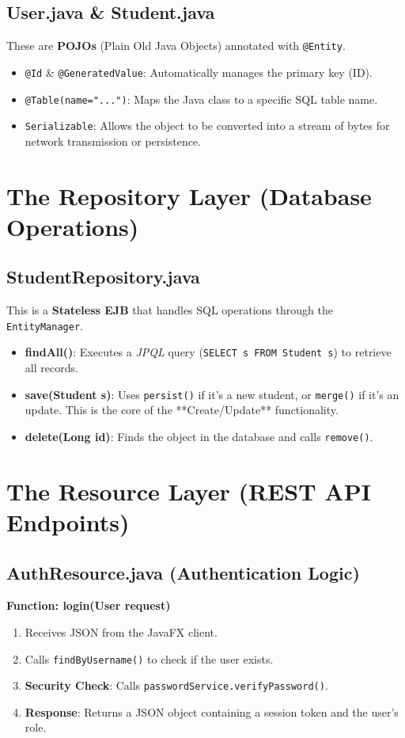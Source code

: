 \documentclass[12pt,a4paper]{article}
\begin{document}
\subsection{User.java \& Student.java}
These are \textbf{POJOs} (Plain Old Java Objects) annotated with \texttt{@Entity}.
\begin{itemize}
    \item \texttt{@Id} \& \texttt{@GeneratedValue}: Automatically manages the primary key (ID).
    \item \texttt{@Table(name="...")}: Maps the Java class to a specific SQL table name.
    \item \texttt{Serializable}: Allows the object to be converted into a stream of bytes for network transmission or persistence.
\end{itemize}

\section{The Repository Layer (Database Operations)}

\subsection{StudentRepository.java}
This is a \textbf{Stateless EJB} that handles SQL operations through the \texttt{EntityManager}.
\begin{itemize}
    \item \textbf{findAll()}: Executes a \textit{JPQL} query (\texttt{SELECT s FROM Student s}) to retrieve all records.
    \item \textbf{save(Student s)}: Uses \texttt{persist()} if it's a new student, or \texttt{merge()} if it's an update. This is the core of the **Create/Update** functionality.
    \item \textbf{delete(Long id)}: Finds the object in the database and calls \texttt{remove()}.
\end{itemize}

\section{The Resource Layer (REST API Endpoints)}

\subsection{AuthResource.java (Authentication Logic)}
\textbf{Function: login(User request)}
\begin{enumerate}
    \item Receives JSON from the JavaFX client.
    \item Calls \texttt{findByUsername()} to check if the user exists.
    \item \textbf{Security Check}: Calls \texttt{passwordService.verifyPassword()}.
    \item \textbf{Response}: Returns a JSON object containing a session token and the user's role.
\end{enumerate}
\end{document}
